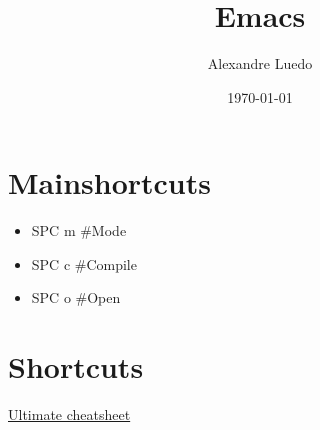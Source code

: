 \documentclass{article}
\author{Alexandre Luedo}
\date{\today}
\title{Emacs}
\begin{document}
\maketitle
\section*{Mainshortcuts}
\label{sec:org3790b57}
\begin{itemize}
\item SPC m \#Mode
\item SPC c \#Compile
\item SPC o \#Open
\end{itemize}
\section*{Shortcuts}
\label{sec:orgb66b68e}
\href{https://github.com/niyumard/Doom-Emacs-Cheat-Sheet}{Ultimate cheatsheet}
\end{document}
